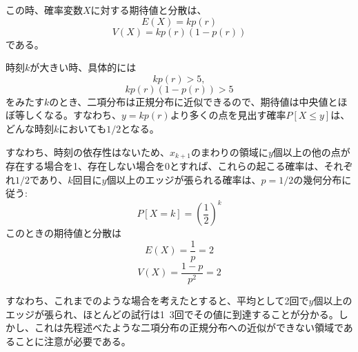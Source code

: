 この時、確率変数$X$に対する期待値と分散は、
$$E(X) = kp(r)$$
$$V(X) = kp(r)(1-p(r))$$
である。

時刻$k$が大きい時、具体的には
$$kp(r) > 5,$$
$$kp(r)(1-p(r)) > 5$$
をみたす$k$のとき、二項分布は正規分布に近似できるので、期待値は中央値とほぼ等しくなる。すなわち、$y=kp(r)$より多くの点を見出す確率$P[X\le y]$は、どんな時刻$k$においても$1/2$となる。

すなわち、時刻の依存性はないため、$x_{k+1}$のまわりの領域に$y$個以上の他の点が存在する場合を1、存在しない場合を0とすれば、これらの起こる確率は、それぞれ$1/2$であり、$k$回目に$y$個以上のエッジが張られる確率は、$p=1/2$の幾何分布に従う:
$$P[X=k] = \left( \frac{1}{2} \right)^{k}$$
このときの期待値と分散は
$$E(X) = \frac{1}{p} = 2$$
$$V(X) = \frac{1-p}{p^{2}} = 2$$

すなわち、これまでのような場合を考えたとすると、平均として2回で$y$個以上のエッジが張られ、ほとんどの試行は1~3回でその値に到達することが分かる。しかし、これは先程述べたような二項分布の正規分布への近似ができない領域であることに注意が必要である。
